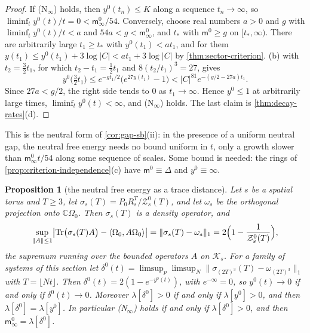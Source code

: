 \documentclass[11pt,a4paper]{amsart}
\newtheorem{proposition}[theorem]{Proposition}
\theoremstyle{definition}
\theoremstyle{remark}
\numberwithin{equation}{section}
\DeclareMathOperator{\Tr}{Tr}        %
\newcommand{\C}{\mathbb{C}}          %
\newcommand{\Kspace}{\mathcal{K}}    %
\newcommand{\ip}[2]{\langle #1,#2\rangle}  %
\newcommand{\norm}[1]{\lVert #1\rVert}     %
\newcommand{\abs}[1]{\lvert #1\rvert}      %
\newcommand{\TT}{\mathbb{T}}               %
\newcommand{\Zc}{\mathcal{Z}}              %
\newcommand{\cube}[1]{(2#1)^3}             %
\newcommand{\Omegazero}{\Omega_0}          %
\begin{document}
\begin{proof}
If \textup{(N$_\infty$)} holds, then $y^0(t_n)\le K$ along a sequence $t_n\to\infty$, so $\liminf_ty^0(t)/t=0<\mathsf m^0_\infty/54$. Conversely, choose real numbers $a>0$ and $g$ with $\liminf_ty^0(t)/t<a$ and $54a<g<\mathsf m^0_\infty$, and $t_*$ with $\mathsf m^0\ge g$ on $[t_*,\infty)$. There are arbitrarily large $t_1\ge t_*$ with $y^0(t_1)<at_1$, and for them $y(t_1)\le y^0(t_1)+3\log\abs C<at_1+3\log\abs C$ by \cref{thm:sector-criterion}. \textup{(b)} with $t_2=\frac32t_1$, for which $t_2-t_1=\frac12t_1$ and $8(t_2/t_1)^3=27$, gives
\[
y^0\bigl(\tfrac32t_1\bigr)\le e^{-gt_1/2}\bigl(e^{27y(t_1)}-1\bigr)<\abs C^{81}e^{-(g/2-27a)t_1}.
\]
Since $27a<g/2$, the right side tends to $0$ as $t_1\to\infty$. Hence $y^0\le1$ at arbitrarily large times, $\liminf_ty^0(t)<\infty$, and \textup{(N$_\infty$)} holds. The last claim is \cref{thm:decay-rates}\textup{(d)}.
\end{proof}

This is the neutral form of \cref{cor:gap-sb}\textup{(ii)}: in the presence of a uniform neutral gap, the neutral free energy needs no bound uniform in $t$, only a growth slower than $\mathsf m^0_\infty t/54$ along some sequence of scales. Some bound is needed: the rings of \cref{prop:criterion-independence}\textup{(c)} have $\mathsf m^0\equiv\Delta$ and $y^0\equiv\infty$.

\begin{proposition}[the neutral free energy as a trace distance]\label{prop:neutral-trace-distance}
Let $s$ be a spatial torus and $T\ge3$, let $\sigma_s(T)=P_0R_s^T/\Zc^0_s(T)$, and let $\omega_s$ be the orthogonal projection onto $\C\Omegazero$. Then $\sigma_s(T)$ is a density operator, and
\begin{equation}\label{eq:neutral-trace-distance}
\sup_{\norm A\le1}\bigl|\Tr\bigl(\sigma_s(T)A\bigr)-\ip{\Omegazero}{A\Omegazero}\bigr|=\norm{\sigma_s(T)-\omega_s}_1=2\Bigl(1-\frac1{\Zc^0_s(T)}\Bigr),
\end{equation}
the supremum running over the bounded operators $A$ on $\Kspace_s$. For a family of systems of this section let $\delta^0(t)=\limsup_p\limsup_N\norm{\sigma_{\cube T}(T)-\omega_{\cube T}}_1$ with $T=\lfloor Nt\rfloor$. Then $\delta^0(t)=2(1-e^{-y^0(t)})$, with $e^{-\infty}=0$, so $y^0(t)\to0$ if and only if $\delta^0(t)\to0$. Moreover $\lambda[\delta^0]>0$ if and only if $\lambda[y^0]>0$, and then $\lambda[\delta^0]=\lambda[y^0]$. In particular \textup{(N$_\infty$)} holds if and only if $\lambda[\delta^0]>0$, and then $\mathsf m^0_\infty=\lambda[\delta^0]$.
\end{proposition}
\end{document}

